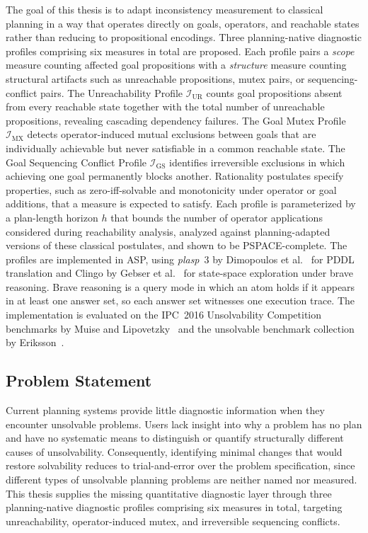 The goal of this thesis is to adapt inconsistency measurement to classical planning in a way that operates directly on goals, operators, and reachable states rather than reducing to propositional encodings. Three planning-native diagnostic profiles comprising six measures in total are proposed. Each profile pairs a \emph{scope} measure counting affected goal propositions with a \emph{structure} measure counting structural artifacts such as unreachable propositions, mutex pairs, or sequencing-conflict pairs. The Unreachability Profile $\mathcal{I}_{\text{UR}}$ counts goal propositions absent from every reachable state together with the total number of unreachable propositions, revealing cascading dependency failures. The Goal Mutex Profile $\mathcal{I}_{\text{MX}}$ detects operator-induced mutual exclusions between goals that are individually achievable but never satisfiable in a common reachable state. The Goal Sequencing Conflict Profile $\mathcal{I}_{\text{GS}}$ identifies irreversible exclusions in which achieving one goal permanently blocks another. Rationality postulates specify properties, such as zero-iff-solvable and monotonicity under operator or goal additions, that a measure is expected to satisfy. Each profile is parameterized by a plan-length horizon $h$ that bounds the number of operator applications considered during reachability analysis, analyzed against planning-adapted versions of these classical postulates, and shown to be PSPACE-complete. The profiles are implemented in \ac{ASP}, using \textit{plasp}~3 by Dimopoulos et al.~\cite{Dimopoulos2019} for \ac{PDDL} translation and Clingo by Gebser et al.~\cite{Gebser2012} for state-space exploration under brave reasoning. Brave reasoning is a query mode in which an atom holds if it appears in at least one answer set, so each answer set witnesses one execution trace. The implementation is evaluated on the \ac{IPC}~2016 Unsolvability Competition benchmarks by Muise and Lipovetzky~\cite{Muise2016} and the unsolvable benchmark collection by Eriksson~\cite{Eriksson2019}.

\subsection{Problem Statement}
\label{sec:problem_statement}

Current planning systems provide little diagnostic information when they encoun\-ter unsolvable problems. Users lack insight into why a problem has no plan and have no systematic means to distinguish or quantify structurally different causes of unsolvability. Consequently, identifying minimal changes that would restore solvability reduces to trial-and-error over the problem specification, since different types of unsolvable planning problems are neither named nor measured. This thesis supplies the missing quantitative diagnostic layer through three planning-native diagnostic profiles comprising six measures in total, targeting unreachability, operator-induced mutex, and irreversible sequencing conflicts.

